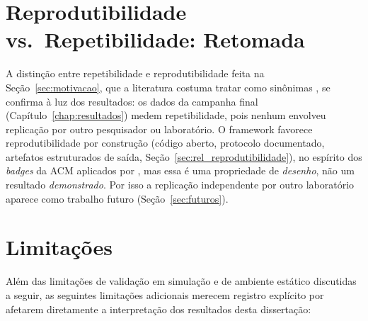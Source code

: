 \section{Reprodutibilidade vs.\ Repetibilidade: Retomada}
\label{sec:repro_vs_repet}

A distinção entre repetibilidade e reprodutibilidade feita na
Seção~\ref{sec:motivacao}, que a literatura costuma tratar como sinônimas
\cite{acm2020badging, bonsignorio2015}, se confirma à luz dos resultados: os
dados da campanha final (Capítulo~\ref{chap:resultados}) medem repetibilidade,
pois nenhum envolveu replicação por outro pesquisador ou laboratório. O
framework favorece reprodutibilidade por construção (código aberto, protocolo
documentado, artefatos estruturados de saída, Seção~\ref{sec:rel_reprodutibilidade}),
no espírito dos \textit{badges} da ACM aplicados por ,
mas essa é uma propriedade de \emph{desenho}, não um resultado
\emph{demonstrado}. Por isso a replicação independente por outro laboratório
aparece como trabalho futuro (Seção~\ref{sec:futuros}).

\section{Limitações}
\label{sec:limitacoes}

Além das limitações de validação em simulação e de ambiente estático discutidas
a seguir, as seguintes limitações adicionais merecem registro explícito por
afetarem diretamente a interpretação dos resultados desta dissertação:


